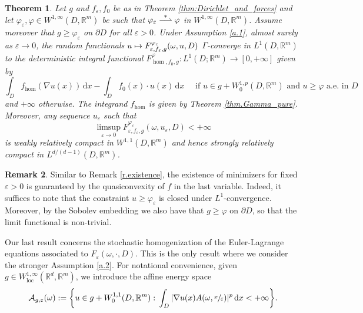 \documentclass[10pt]{amsart}
\def\mto{\mathchoice{\longmapsto}{\mapsto}{\mapsto}{\mapsto}}
\def\harptod{\mathrel{\relbar\joinrel\rightharpoonup}}
\def\harpto{\mathchoice{\harptod}{\rightharpoonup}{\rightharpoonup}{\rightharpoonup}}
\def\harptostar{\mathchoice{\overset{\textstyle*}{\harpto}}{\overset{*}{\harptod}}{\overset{*}{\rightharpoonup}}{\overset{*}{\rightharpoonup}}}
\newtheorem{theorem}{Theorem}[section]
\theoremstyle{definition}
\newtheorem{remark}[theorem]{Remark}
\let\e\varepsilon
\let\w\omega
\newcommand{\dx}{\,\mathrm{d}x}
\newcommand{\R}{\mathbb{R}}
\begin{document}
\begin{theorem}\label{thm.obstacle}
Let $g$ and $f_{\e},f_0$ be as in Theorem \ref{thm:Dirichlet_and_forces} and let $\varphi_{\e},\varphi\in W^{1,\infty}(D,\R^m)$ be such that $\varphi_{\e}\harptostar\varphi$ in $W^{1,\infty}(D,\R^m)$. Assume moreover that $g\geq\varphi_{\e}$ on $\partial D$ for all $\e>0$. Under Assumption \ref{a.1}, almost surely as $\e\to 0$, the random functionals $u\mto F^{\varphi_{\e}}_{\e,f_{\e},g}(\w,u,D)$ $\Gamma$-converge in $L^1(D,\R^m)$ to the deterministic integral functional $F^{\varphi}_{\hom,f_0,g}:L^1(D;\R^m)\to [0,+\infty]$ given by
\begin{equation*}
\int_D f_{\hom}(\nabla u(x))\dx-\int_Df_0(x)\cdot u(x)\dx \quad\text{ if }u\in g+W^{1,p}_0(D,\R^m)\text{ and }u\geq\varphi\text{ a.e.\ in }D
\end{equation*}
and $+\infty$ otherwise. The integrand $f_{\hom}$ is given by Theorem \ref{thm.Gamma_pure}. Moreover, any sequence $u_{\e}$ such that
\begin{equation*}
\limsup_{\e\to 0}F^{\varphi_{\e}}_{\e,f_{\e},g}(\w,u_{\e},D)<+\infty
\end{equation*}
is weakly relatively compact in $W^{1,1}(D,\R^m)$ and hence strongly relatively compact in $L^{d/(d-1)}(D,\R^m)$.
\end{theorem}
\begin{remark}
Similar to Remark \ref{r.existence}, the existence of minimizers for fixed $\e>0$ is guaranteed by the quasiconvexity of $f$ in the last variable. Indeed, it suffices to note that the constraint $u\geq\varphi_{\e}$ is closed under $L^1$-convergence. Moreover, by the Sobolev embedding we also have that $g\geq \varphi$ on $\partial D$, so that the limit functional is non-trivial.
\end{remark}

Our last result concerns the stochastic homogenization of the Euler-Lagrange equations associated to $F_{\e}(\w,\cdot,D)$. This is the only result where we consider the stronger Assumption \ref{a.2}. For notational convenience, given $g\in W^{1,\infty}_\mathrm{loc}(\R^d,\R^m)$, we introduce the affine energy space
\begin{equation*}
\mathcal{A}_{g,\e}(\w):=\biggl\{u\in g+W^{1,1}_0(D,\R^m):\,\int_D|\nabla u(x)A(\w,\sfrac{x}{\e})|^p\dx<+\infty\biggr\}.
\end{equation*}
\end{document}
